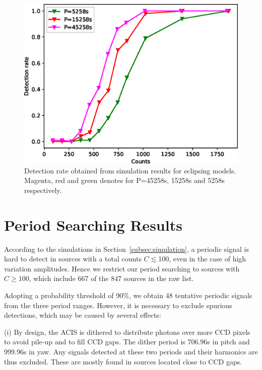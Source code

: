 \documentclass[twoside,twocolumn]{aastex63}
\begin{document}
\begin{figure}[ht!]
\centering
\includegraphics[scale=0.61]{./figure/sim_LW/eclipse_cut.eps}
\caption{Detection rate obtained from simulation results for eclipsing models. Magenta, red and green denotes for P=45258s, 15258s and 5258s respectively. \label{fig:eclipse}}
\end{figure}


\section{Period Searching Results}\label{sec:results}
According to the simulations in Section~\ref{subsec:simulation}, a periodic signal is hard to detect in sources with a total counts $C\lesssim$100, even in the case of high variation amplitudes.  
Hence we restrict our period searching to sources with $C \geq 100$, which include 667 of the 847 sources in the raw list.

Adopting a probability threshold of 90\%, we obtain 48 tentative periodic signals from the three period ranges. However, it is necessary to exclude spurious detections, which may be caused by several effects:

(i) By design, the ACIS is dithered to distribute photons over more CCD pixels to avoid pile-up and to fill CCD gaps.  The dither period is 706.96s in pitch and 999.96s in yaw. Any signals detected at these two periods and their harmonics are thus excluded. These are mostly found in sources located close to CCD gaps.
\end{document}
